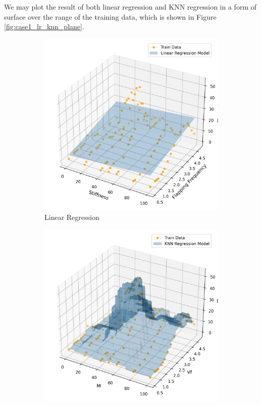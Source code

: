 \documentclass[conf]{new-aiaa}
\begin{document}
We may plot the result of both linear regression and KNN regression in a form of surface over the range of the training data, which is shown in Figure \ref{fig:case1_lr_knn_plane}.
\begin{figure}[H]
    \centering
    \begin{subfigure}{0.4\textwidth}
        \centering
        \includegraphics[width=1.0\textwidth]{graph/case1_lr_plane.png}
        \caption{Linear Regression}
    \end{subfigure}
    \hfill
    \begin{subfigure}{0.4\textwidth}
        \centering
        \includegraphics[width=1.0\textwidth]{graph/case1_knnr_plane.png}

\end{subfigure}
\end{figure}
\end{document}
